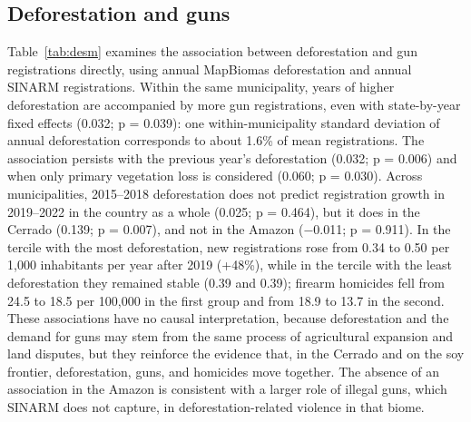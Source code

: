 \documentclass[11pt,a4paper]{article}
\begin{document}
\subsection*{Deforestation and guns}

Table~\ref{tab:desm} examines the association between deforestation and gun registrations directly, using annual MapBiomas deforestation and annual SINARM registrations. Within the same municipality, years of higher deforestation are accompanied by more gun registrations, even with state-by-year fixed effects (0.032; p = 0.039): one within-municipality standard deviation of annual deforestation corresponds to about 1.6\% of mean registrations. The association persists with the previous year's deforestation (0.032; p = 0.006) and when only primary vegetation loss is considered (0.060; p = 0.030). Across municipalities, 2015--2018 deforestation does not predict registration growth in 2019--2022 in the country as a whole (0.025; p = 0.464), but it does in the Cerrado (0.139; p = 0.007), and not in the Amazon ($-$0.011; p = 0.911). In the tercile with the most deforestation, new registrations rose from 0.34 to 0.50 per 1,000 inhabitants per year after 2019 (+48\%), while in the tercile with the least deforestation they remained stable (0.39 and 0.39); firearm homicides fell from 24.5 to 18.5 per 100,000 in the first group and from 18.9 to 13.7 in the second. These associations have no causal interpretation, because deforestation and the demand for guns may stem from the same process of agricultural expansion and land disputes, but they reinforce the evidence that, in the Cerrado and on the soy frontier, deforestation, guns, and homicides move together. The absence of an association in the Amazon is consistent with a larger role of illegal guns, which SINARM does not capture, in deforestation-related violence in that biome.
\end{document}
